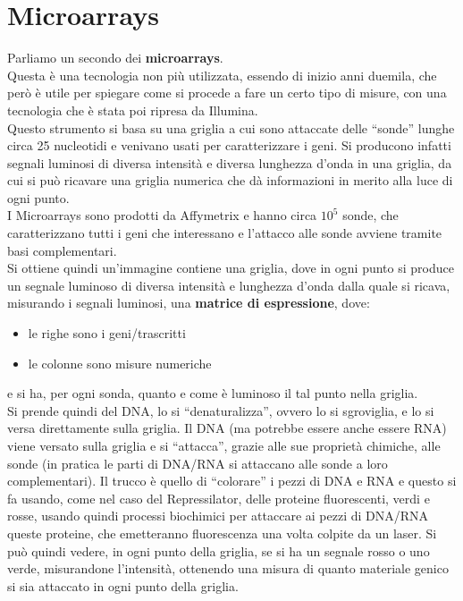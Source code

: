\documentclass[a4paper,12pt, oneside]{book}
\begin{document}
\section{Microarrays}
Parliamo un secondo dei \textbf{microarrays}.\\
Questa è una tecnologia non più utilizzata, essendo di inizio anni duemila, che
però è utile per spiegare come si procede a fare un certo tipo di misure, con
una tecnologia che è stata poi ripresa da Illumina.\\
Questo strumento si basa su una griglia a cui sono attaccate delle ``sonde''
lunghe circa 25 nucleotidi e venivano usati per caratterizzare i geni. Si
producono infatti segnali luminosi di diversa intensità e diversa lunghezza
d'onda in una griglia, da cui si può ricavare una griglia numerica che dà
informazioni in merito alla luce di ogni punto.\\
I Microarrays sono prodotti da Affymetrix e hanno circa $10^5$ sonde, che
caratterizzano tutti i geni che interessano e l'attacco alle sonde avviene
tramite basi complementari. \\
Si ottiene quindi un'immagine contiene una griglia, dove in ogni punto si
produce un segnale luminoso di diversa intensità e lunghezza d'onda dalla quale
si ricava, misurando i segnali luminosi, una \textbf{matrice di espressione},
dove:
\begin{itemize}
  \item le righe sono i geni/trascritti
  \item le colonne sono misure numeriche
\end{itemize}
e si ha, per ogni sonda, quanto e come è luminoso il tal punto nella griglia.\\
Si prende quindi del DNA, lo si ``denaturalizza'', ovvero lo si sgroviglia, e lo
si versa direttamente sulla griglia. Il DNA (ma potrebbe essere anche essere
RNA) viene versato sulla griglia e si ``attacca'', grazie alle sue proprietà
chimiche, alle sonde (in pratica le parti di DNA/RNA si attaccano alle sonde a
loro complementari). Il trucco è quello di ``colorare'' i pezzi di DNA e RNA e
questo si fa usando, come nel caso del Repressilator, delle proteine
fluorescenti, verdi e rosse, usando quindi processi biochimici per attaccare ai
pezzi di DNA/RNA queste proteine, che emetteranno fluorescenza una volta colpite
da un laser. Si può quindi vedere, in ogni punto della griglia, se si ha un
segnale rosso o uno verde, misurandone l'intensità, ottenendo una misura di
quanto materiale genico si sia attaccato in ogni punto della griglia.\\
\end{document}
